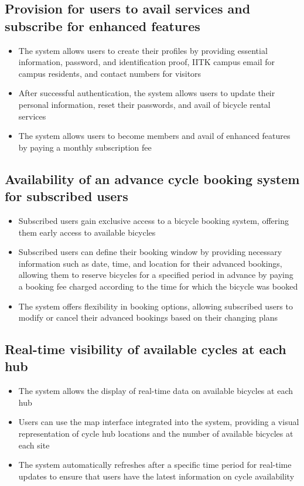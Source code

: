 \documentclass{scrreprt}
\begin{document}
\subsection{Provision for users to avail services and subscribe for enhanced features}
\begin{itemize}
    \item The system allows users to create their profiles by providing essential information, password, and identification proof, IITK campus email for campus residents, and contact numbers for visitors
    \item After successful authentication, the system allows users to update their personal information, reset their passwords, and avail of bicycle rental services
    \item The system allows users to become members and avail of enhanced features by paying a monthly subscription fee
\end{itemize}

\subsection{Availability of an advance cycle booking system for subscribed users}
\begin{itemize}
    \item Subscribed users gain exclusive access to a bicycle booking system, offering them early access to available bicycles
    \item Subscribed users can define their booking window by providing necessary information such as date, time, and location for their advanced bookings, allowing them to reserve bicycles for a specified period in advance by paying a booking fee charged according to the time for which the bicycle was booked
    \item The system offers flexibility in booking options, allowing subscribed users to modify or cancel their advanced bookings based on their changing plans
\end{itemize}

\subsection{Real-time visibility of available cycles at each hub}
\begin{itemize}
    \item The system allows the display of real-time data on available bicycles at each hub
    \item Users can use the map interface integrated into the system, providing a visual representation of cycle hub locations and the number of available bicycles at each site
    \item The system automatically refreshes after a specific time period for real-time updates to ensure that users have the latest information on cycle availability
\end{itemize}
\end{document}
